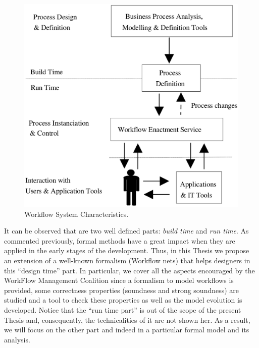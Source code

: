 \begin{figure}
\begin{center}
  \includegraphics[scale=0.25]{Figures/wfmsarquitectura.eps}
\end{center}
  \caption{Workflow System Characteristics.}
  \label{fig:wfms}
\end{figure}

It can be observed that are two well defined parts: \emph{build time} and \emph{run time}. As commented previously, formal methods have a 
great impact when they are applied in the early stages of the development. Thus, in this Thesis we propose an extension of a well-known formalism (Workflow nets)
that helps designers in this ``design time'' part. In particular, we cover all the aspects encouraged by the WorkFlow Management Coalition since a formalism to model workflows is provided, some correctness properties (soundness and strong soundness) are studied and a tool to check these properties as well as the model 
evolution is developed. Notice that the ``run time part'' is out of the scope of the present Thesis and, consequently, the technicalities of it are not shown her.
As a result, we will focus on the other part and indeed in a particular formal model and its analysis.

